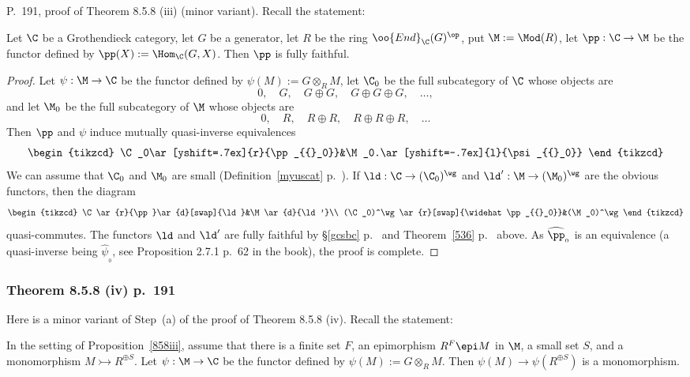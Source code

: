 \documentclass[12pt]{article}
\theoremstyle{remark}
\theoremstyle{definition}
\begin{document}
\begin{s} P.~191, proof of Theorem 8.5.8 (iii) (minor variant). Recall the statement: 

\begin{prop}
Let $\C$ be a Grothendieck category, let $G$ be a generator, let $R$ be the ring $\oo{End}_\C(G)^{\op}$, put $\M:=\Mod(R)$, let $\pp:\C\to\M$ be the functor defined by $\pp(X):=\Hom_\C(G,X)$. Then $\pp$ is fully faithful. 
\end{prop}

\begin{proof}
Let $\psi:\M\to\C$ be the functor defined by $\psi(M):=G\otimes_RM$, let $\C_0$ be the full subcategory of $\C$ whose objects are 
$$
0,\quad G,\quad G\oplus G,\quad G\oplus G\oplus G,\quad\dots,
$$
and let $\M_0$ be the full subcategory of $\M$ whose objects are 
$$
0,\quad R,\quad R\oplus R,\quad R\oplus R\oplus R,\quad\dots
$$
Then $\pp$ and $\psi$ induce mutually quasi-inverse equivalences 
$$
\begin{tikzcd}
\C_0\ar[yshift=.7ex]{r}{\pp_{{}_0}}&\M_0.\ar[yshift=-.7ex]{l}{\psi_{{}_0}}
\end{tikzcd}
$$ 
We can assume that $\C_0$ and $\M_0$ are small (Definition~\ref{myuscat} p.~). If $\ld:\C\to(\C_0)^\wg$ and $\ld':\M\to(\M_0)^\wg$ are the obvious functors, then the diagram 
$$
\begin{tikzcd}
\C\ar{r}{\pp}\ar{d}[swap]{\ld}&\M\ar{d}{\ld'}\\
(\C_0)^\wg\ar{r}[swap]{\widehat\pp_{{}_0}}&(\M_0)^\wg
\end{tikzcd}
$$ 
quasi-commutes. The functors $\ld$ and $\ld'$ are fully faithful by \S\ref{gcsbc} p.~ and %
Theorem~\ref{536} p.~ above. As $\widehat\pp_{{}_0}$ is an equivalence (a quasi-inverse being $\widehat\psi_{{}_0}$, see Proposition 2.7.1 p.~62 in the book), the proof is complete.
\end{proof}
\end{s}


\subsubsection{Theorem 8.5.8 (iv) p.~191} 

Here is a minor variant of Step~(a) of the proof of Theorem 8.5.8 (iv). Recall the statement: 

\begin{lem}
In the setting of Proposition~\ref{858iii}, assume that there is a finite set $F$, an epimorphism $R^F\epi M$ in $\M$, a small set $S$, and a monomorphism $M\rightarrowtail R^{\oplus S}$. Let $\psi:\M\to\C$ be the functor defined by $\psi(M):=G\otimes_RM$. Then $\psi(M)\to\psi(R^{\oplus S})$ is a monomorphism. 
\end{lem}
\end{document}
